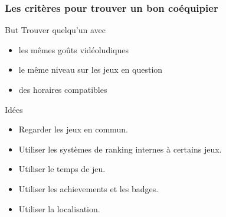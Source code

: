 \documentclass[10pt]{beamer}
\begin{document}
\begin{frame}
 \frametitle{Les critères pour trouver un bon coéquipier}
 
 \begin{block}{But}
 Trouver quelqu'un avec
 \begin{itemize}
  \item les mêmes goûts vidéoludiques
  \item le même niveau sur les jeux en question
  \item des horaires compatibles
 \end{itemize}
 \end{block}
 
 \begin{block}{Idées}
  \begin{itemize}
   \item Regarder les jeux en commun.
   \item Utiliser les systèmes de ranking internes à certains jeux. 
   \item Utiliser le temps de jeu. 
   \item Utiliser les achievements et les badges. 
   \item Utiliser la localisation. 
  \end{itemize}

 \end{block}
 
\end{frame}
\end{document}

